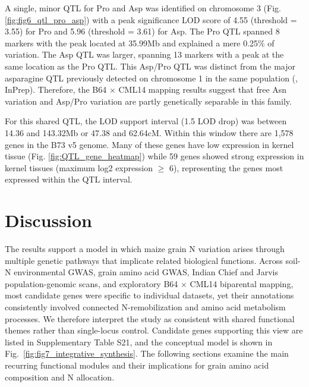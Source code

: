 
A single, minor QTL for Pro and Asp was identified on chromosome 3 (Fig. \ref{fig:fig6_qtl_pro_asp}) with a peak significance LOD score of 4.55 (threshold = 3.55) for Pro and 5.96 (threshold = 3.61) for Asp. The Pro QTL spanned 8 markers with the peak located at 35.99Mb and explained a mere 0.25\% of variation. The Asp QTL was larger, spanning 13 markers with a peak at the same location as the Pro QTL. This Asp/Pro QTL was distinct from the major asparagine QTL previously detected  on chromosome 1 in the same population (\cite{Fitzsimmons2026KernelKitchen}, InPrep). Therefore, the B64 $\times$ CML14 mapping results suggest that free Asn variation and Asp/Pro variation are partly genetically separable in this family.

For this shared QTL, the LOD support interval (1.5 LOD drop) was between 14.36 and 143.32Mb or 47.38 and 62.64cM. Within this window there are 1,578 genes in the B73 v5 genome. Many of these genes have low expression in kernel tissue (Fig. \ref{fig:QTL_gene_heatmap})  while 59 genes showed strong expression in kernel tissues (maximum log2 expression $\geq$ 6), representing the genes most expressed within the QTL interval.


\section{Discussion}\label{sec12}

The results support a model in which maize grain N variation arises through multiple genetic pathways that implicate related biological functions. Across soil-N environmental GWAS, grain amino acid GWAS, Indian Chief and Jarvis population-genomic scans, and exploratory B64 $\times$ CML14 biparental mapping, most candidate genes were specific to individual datasets, yet their annotations consistently involved connected N-remobilization and amino acid metabolism processes. We therefore interpret the study as consistent with shared functional themes rather than single-locus control. Candidate genes supporting this view are listed in Supplementary Table S21, and the conceptual model is shown in Fig.~\ref{fig:fig7_integrative_synthesis}. The following sections examine the main recurring functional modules and their implications for grain amino acid composition and N allocation.



